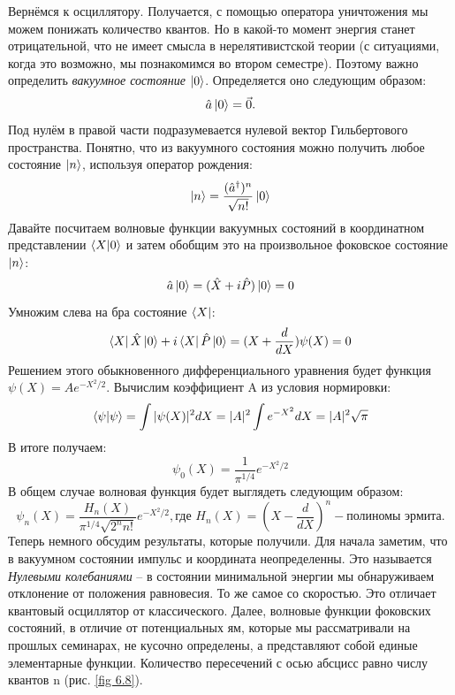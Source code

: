 Вернёмся к осциллятору. Получается, с помощью оператора уничтожения мы можем понижать количество квантов. Но в какой-то момент энергия станет отрицательной, что не имеет смысла в нерелятивистской теории (с ситуациями, когда это возможно, мы познакомимся во втором семестре). Поэтому важно определить \textit{вакуумное состояние} $\ket{0}$. Определяется оно следующим образом:
\[
\hat{a}\ket{0} = \vec 0.
\]
Под нулём в правой части подразумевается нулевой вектор Гильбертового пространства. Понятно, что из вакуумного состояния можно получить любое состояние $\ket{n}$, используя оператор рождения:
\[
\ket{n} = \frac{(\hat{a}^{\dagger})^n}{\sqrt{n!}}\ket{0}
\]
Давайте посчитаем волновые функции вакуумных состояний в координатном представлении $\bra{X}\ket{0}$ и затем обобщим это на произвольное фоковское состояние $\ket{n}$:
\[
\hat{a}\ket{0} = (\hat{X} + i\hat{P})\ket{0} = 0
\]
Умножим слева на бра состояние $\bra{X}$:
\[
\bra{X}\hat{X}\ket{0} + i\bra{X}\hat{P}\ket{0} = (X + \frac{d}{dX})\psi(X) = 0
\]
Решением этого обыкновенного дифференциального уравнения будет функция $\psi(X) = Ae^{-X^2/2}$. Вычислим коэффициент A из условия нормировки:
\[
\braket{\psi} = \int |\psi(X)|^2 dX = |A|^2\int e^{-X^2}dX = |A|^2\sqrt{\pi}
\]
В итоге получаем:
\[
\psi_0(X) = \frac{1}{\pi^{1/4}}e^{-X^2/2}
\]
В общем случае волновая функция будет выглядеть следующим образом:
\[
\psi_n(X) = \frac{H_n(X)}{\pi^{1/4}\sqrt{2^n n!}}e^{-X^2/2}, \text{где } H_n(X) = (X - \frac{d}{dX})^n - \text{полиномы эрмита}.
\]
Теперь немного обсудим результаты, которые получили. Для начала заметим, что в вакуумном состоянии импульс и координата неопределенны. Это называется \textit{Нулевыми колебаниями} – в состоянии минимальной энергии мы обнаруживаем отклонение от положения равновесия. То же самое со скоростью. Это отличает квантовый осциллятор от классического. Далее, волновые функции фоковских состояний, в отличие от потенциальных ям, которые мы рассматривали на прошлых семинарах, не кусочно определены, а представляют собой единые элементарные функции. Количество пересечений с осью абсцисс равно числу квантов n (рис. \ref{fig 6.8}). 
